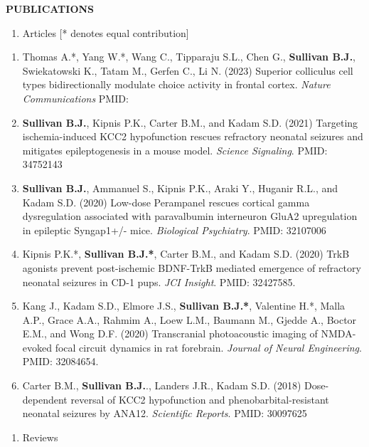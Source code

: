 \documentclass{resume} %
\begin{document}
\begin{rSection}{{\bfseries PUBLICATIONS}}

    \begin{enumerate}[resume, leftmargin=0pt]
        \item [] Articles [* denotes equal contribution]
         \end{enumerate}

    \begin{enumerate}[resume, leftmargin=2em]
        \item Thomas A.*, Yang W.*, Wang C., Tipparaju S.L., Chen G., {\bfseries Sullivan B.J.}, Swiekatowski K., Tatam M., Gerfen C., Li N. (2023) Superior colliculus cell types bidirectionally modulate choice activity in frontal cortex. \emph{Nature Communications} PMID:
        \item {\bfseries Sullivan B.J.}, Kipnis P.K., Carter B.M., and Kadam S.D. (2021) Targeting ischemia-induced KCC2 hypofunction rescues refractory neonatal seizures and mitigates epileptogenesis in a mouse model. \emph{Science Signaling}. PMID: 34752143
        \item {\bfseries Sullivan B.J.}, Ammanuel S., Kipnis P.K., Araki Y., Huganir R.L., and Kadam S.D. (2020) Low-dose Perampanel rescues cortical gamma dysregulation associated with paravalbumin interneuron GluA2 upregulation in epileptic Syngap1+/- mice. \emph{Biological Psychiatry}. PMID: 32107006
        \item Kipnis P.K.*, {\bfseries Sullivan B.J.*}, Carter B.M., and Kadam S.D. (2020) TrkB agonists prevent post-ischemic BDNF-TrkB mediated emergence of refractory neonatal seizures in CD-1 pups. \emph{JCI Insight}. PMID: 32427585. 
        \item Kang J., Kadam S.D., Elmore J.S., {\bfseries Sullivan B.J.*}, Valentine H.*, Malla A.P., Grace A.A., Rahmim A., Loew L.M., Baumann M., Gjedde A., Boctor E.M., and Wong D.F. (2020) Transcranial photoacoustic imaging of NMDA-evoked focal circuit dynamics in rat forebrain. \emph{Journal of Neural Engineering}. PMID: 32084654. 
        \item Carter B.M., {\bfseries Sullivan B.J.}., Landers J.R., Kadam S.D. (2018) Dose-dependent reversal of KCC2 hypofunction and phenobarbital-resistant neonatal seizures by ANA12. \emph{Scientific Reports}. PMID: 30097625
    \end{enumerate}
    \newpage
    \begin{enumerate}[leftmargin=0pt]
        \item [] Reviews
    \end{enumerate}


\end{rSection}
\end{document}
